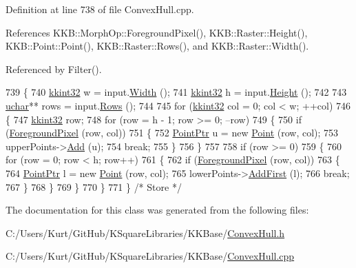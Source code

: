 Definition at line 738 of file Convex\+Hull.\+cpp.



References K\+K\+B\+::\+Morph\+Op\+::\+Foreground\+Pixel(), K\+K\+B\+::\+Raster\+::\+Height(), K\+K\+B\+::\+Point\+::\+Point(), K\+K\+B\+::\+Raster\+::\+Rows(), and K\+K\+B\+::\+Raster\+::\+Width().



Referenced by Filter().


\begin{DoxyCode}
739 \{
740   \hyperlink{namespace_k_k_b_a8fa4952cc84fda1de4bec1fbdd8d5b1b}{kkint32} w = input.\hyperlink{class_k_k_b_1_1_raster_aa2780c0b7ae75b7b595f99329689c1f6}{Width} ();
741   \hyperlink{namespace_k_k_b_a8fa4952cc84fda1de4bec1fbdd8d5b1b}{kkint32} h = input.\hyperlink{class_k_k_b_1_1_raster_af8d10d15697d5b92fb9595c48b529feb}{Height} ();
742 
743   \hyperlink{namespace_k_k_b_ace9969169bf514f9ee6185186949cdf7}{uchar}**  rows = input.\hyperlink{class_k_k_b_1_1_raster_a2460989f656e5222d6074cd0ba85ed72}{Rows} ();
744         
745   \textcolor{keywordflow}{for} (\hyperlink{namespace_k_k_b_a8fa4952cc84fda1de4bec1fbdd8d5b1b}{kkint32} col = 0;  col < w;  ++col)
746   \{
747     \hyperlink{namespace_k_k_b_a8fa4952cc84fda1de4bec1fbdd8d5b1b}{kkint32} row;
748     \textcolor{keywordflow}{for}  (row = h - 1;  row >= 0;  --row)
749     \{
750       \textcolor{keywordflow}{if}  (\hyperlink{class_k_k_b_1_1_morph_op_acd5541050c3c0207b004b71caf7fb1f4}{ForegroundPixel} (row, col))
751       \{
752         \hyperlink{class_k_k_b_1_1_point}{PointPtr} u = \textcolor{keyword}{new} \hyperlink{class_k_k_b_1_1_point}{Point} (row, col);
753         upperPoints->\hyperlink{class_k_k_b_1_1_k_k_queue_adec987ebb0ac593ad877ffa59becb107}{Add} (u);
754         \textcolor{keywordflow}{break};
755       \}
756     \}
757 
758     \textcolor{keywordflow}{if}  (row >= 0)
759     \{
760       \textcolor{keywordflow}{for}  (row = 0; row < h; row++)
761       \{
762         \textcolor{keywordflow}{if}  (\hyperlink{class_k_k_b_1_1_morph_op_acd5541050c3c0207b004b71caf7fb1f4}{ForegroundPixel} (row, col))
763         \{
764           \hyperlink{class_k_k_b_1_1_point}{PointPtr} l = \textcolor{keyword}{new} \hyperlink{class_k_k_b_1_1_point}{Point} (row, col);
765           lowerPoints->\hyperlink{class_k_k_b_1_1_k_k_queue_a1832186a944dca6fb3d5fca4046b7c40}{AddFirst} (l);
766           \textcolor{keywordflow}{break};
767         \}
768       \}
769     \}
770   \}
771 \}  \textcolor{comment}{/* Store */}
\end{DoxyCode}


The documentation for this class was generated from the following files\+:\begin{DoxyCompactItemize}
\item 
C\+:/\+Users/\+Kurt/\+Git\+Hub/\+K\+Square\+Libraries/\+K\+K\+Base/\hyperlink{_convex_hull_8h}{Convex\+Hull.\+h}\item 
C\+:/\+Users/\+Kurt/\+Git\+Hub/\+K\+Square\+Libraries/\+K\+K\+Base/\hyperlink{_convex_hull_8cpp}{Convex\+Hull.\+cpp}\end{DoxyCompactItemize}
